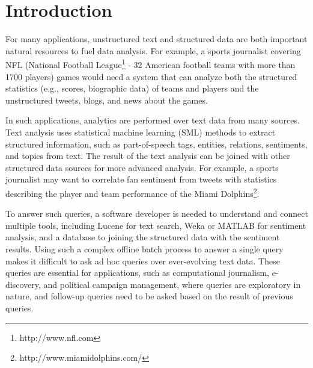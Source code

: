 

\section{Introduction}

For many
applications, unstructured text and structured data are both
important natural resources to fuel data analysis. For example, a
sports journalist covering NFL (National Football
League\footnote{http://www.nfl.com} - 32 American football teams with
more than 1700 players) games would need a system that can analyze both the
structured statistics (e.g., scores, biographic data) of teams and players and the
unstructured tweets, blogs, and news about the games.

In such applications, analytics are performed over text data
from many sources. Text analysis uses 
statistical machine learning (SML) methods to extract structured
information, such as part-of-speech tags, entities, relations, 
sentiments, and topics from
text. The result of the text analysis can be joined with other
structured data sources for more advanced analysis. For example, a sports
journalist may want to correlate fan sentiment from tweets 
with statistics describing the player and team performance
of the Miami Dolphins\footnote{http://www.miamidolphins.com/}.

To answer such queries, a software
developer is needed to understand and connect multiple tools,
including Lucene for text search, Weka or MATLAB for sentiment
analysis, and a database to joining the structured data with the
sentiment results. Using such a complex offline batch process to 
answer a single query
makes it difficult to ask ad hoc queries over ever-evolving text data. 
These queries are essential for applications, such as computational journalism,
e-discovery, and political campaign management, where queries are
exploratory in nature, and follow-up queries need to be asked based
on the result of previous queries.


